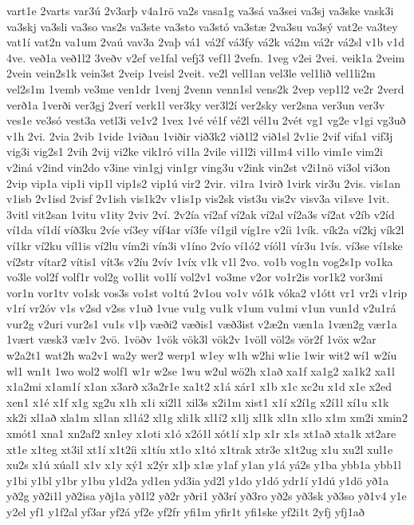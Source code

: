 {vart1e
2varts
var3ú
2v3arþ
v4a1rö
va2s
vasa1g
va3sá
va3sei
va3sj
va3ske
vask3i
va3skj
va3sli
va3so
vas2s
va3ste
va3sto
va3stó
va3stæ
2va3su
va3sý
vat2e
va3tey
vat1í
vat2n
va1um
2vaú
vav3a
2vaþ
vá1
vá2f
vá3fy
vá2k
vá2m
vá2r
vá2sl
v1b
v1d
4ve.
veð1a
veð1l2
3veðv
v2ef
ve1fal
vefj3
vef1l
2vefn.
1veg
v2ei
2vei.
veik1a
2veim
2vein
vein2s1k
vein3st
2veip
1veisl
2veit.
ve2l
vell1an
vel3le
vel1lið
vel1li2m
vel2s1m
1vemb
ve3me
ven1dr
1venj
2venn
venn1sl
vens2k
2vep
vep1l2
ve2r
2verd
verð1a
1verði
ver3gj
2verí
verk1l
ver3ky
ver3l2í
ver2sky
ver2sna
ver3un
ver3v
ves1e
ve3só
vest3a
vetl3i
ve1v2
1vex
1vé
vé1f
vé2l
vél1u
2vét
vg1
vg2e
v1gi
vg3uð
v1h
2vi.
2via
2vib
1vide
1viðau
1viðir
við3k2
við1l2
við1sl
2v1ie
2vif
vifa1
vif3j
vig3i
vig2s1
2vih
2vij
vi2ke
vik1ró
vi1la
2vile
vi1l2i
vil1m4
vi1lo
vim1e
vim2i
v2iná
v2ind
vin2do
v3ine
vin1gj
vin1gr
ving3u
v2ink
vin2st
v2i1nö
vi3ol
vi3on
2vip
vip1a
vip1i
vip1l
vip1s2
vip1ú
vir2
2vir.
vi1ra
1virð
1virk
vir3u
2vis.
vis1an
v1isb
2v1isd
2visf
2v1ish
vis1k2v
v1is1p
vis2sk
vist3u
vis2v
visv3a
vi1sve
1vit.
3vitl
vit2san
1vitu
v1ity
2viv
2ví.
2v2ía
ví2af
ví2ak
ví2al
ví2a3s
ví2at
v2íb
v2íd
ví1da
ví1dí
víð3ku
2víe
ví3ey
víf4ar
ví3fe
ví1gil
víg1re
v2íi
1vík.
vík2a
ví2kj
vík2l
ví1kr
ví2ku
víl1is
ví2lu
vím2i
vín3i
v1íno
2vío
ví1ó2
víól1
vír3u
1vís.
ví3se
ví1ske
ví2str
vítar2
vítis1
vít3s
v2íu
2vív
1víx
v1k
v1l
2vo.
vo1b
vog1n
vog2s1p
vo1ka
vo3le
vol2f
volf1r
vol2g
vo1lit
vo1lí
vol2v1
vo3me
v2or
vo1r2is
vor1k2
vor3mi
vor1n
vor1tv
vo1sk
vos3s
vo1st
vo1tú
2v1ou
vo1v
vó1k
vóka2
v1ótt
vr1
vr2i
v1rip
v1rí
vr2óv
v1s
v2sd
v2ss
v1uð
1vue
vu1g
vu1k
v1um
vu1mi
v1un
vun1d
v2u1rá
vur2g
v2uri
vur2s1
vu1s
v1þ
væði2
væðis1
væð3ist
v2æ2n
væn1a
1væn2g
vær1a
1vært
væsk3
væ1v
2vö.
1vöðv
1vök
vök3l
vök2v
1völl
völ2s
vör2f
1vöx
w2ar
w2a2t1
wat2h
wa2v1
wa2y
wer2
werp1
w1ey
w1h
w2hi
w1ie
1wir
wit2
wí1
w2íu
wl1
wn1t
1wo
wol2
wolf1
w1r
w2se
1wu
w2ul
wö2h
x1að
xa1f
xa1g2
xa1k2
xa1l
x1a2mi
x1am1í
x1an
x3arð
x3a2r1e
xa1t2
x1á
xár1
x1b
x1c
xc2u
x1d
x1e
x2ed
xen1
x1é
x1f
x1g
xg2u
x1h
x1i
xi2l1
xil3s
x2i1m
xist1
x1í
x2í1g
x2í1l
xí1u
x1k
xk2i
xl1að
xla1m
xl1an
xl1á2
xl1g
xli1k
xl1í2
x1lj
xl1k
xl1n
x1lo
x1m
xm2i
xmin2
xmót1
xna1
xn2af2
xn1ey
x1oti
x1ó
x2ó1l
xót1í
x1p
x1r
x1s
xt1að
xta1k
xt2are
xt1e
x1teg
xt3il
xt1í
x1t2íi
x1tíu
xt1o
x1tó
x1trak
xtr3e
x1t2ug
x1u
xu2l
xul1e
xu2s
x1ú
xúal1
x1v
x1y
xý1
x2ýr
x1þ
x1æ
y1af
y1an
y1á
yá2s
y1ba
ybb1a
ybb1l
y1bi
y1bl
y1br
y1bu
y1d2a
yd1en
yd3ia
yd2l
y1do
y1dó
ydr1í
y1dú
y1dö
yð1a
yð2g
yð2i1l
yð2isa
yðj1a
yð1l2
yð2r
yðri1
yð3rí
yð3ro
yð2s
yð3sk
yð3so
yð1v4
y1e
y2el
yf1
y1f2al
yf3ar
yf2á
yf2e
yf2fr
yfi1m
yfir1t
yfi1ske
yf2i1t
2yfj
yfj1að
}
